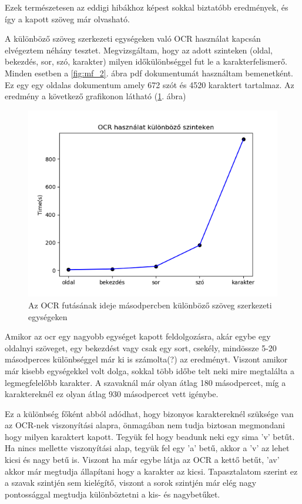 Ezek természetesen az eddigi hibákhoz képest sokkal biztatóbb eredmények, és így a kapott szöveg már olvasható. 

A különböző szöveg szerkezeti egységeken való OCR használat kapcsán elvégeztem néhány tesztet. Megvizsgáltam, hogy az adott szinteken (oldal, bekezdés, sor, szó, karakter) milyen időkülönbséggel fut le a karakterfelismerő. Minden esetben a \ref{fig:mf_2}. ábra pdf dokumentumát használtam bemenetként. Ez egy egy oldalas dokumentum amely 672 szót és 4520 karaktert tartalmaz. Az eredmény a következő grafikonon látható (\ref{fig:test ocr}. ábra)

\begin{figure}[H]
\centering
\includegraphics[scale=1]{images/test_ocr.png}
\caption{Az OCR futásának ideje másodpercben különböző szöveg szerkezeti egységeken}
\label{fig:test ocr}
\end{figure}

Amikor az ocr egy nagyobb egységet kapott feldolgozásra, akár egybe egy oldalnyi szöveget, egy bekezdést vagy csak egy sort, csekély, mindössze 5-20 másodperces különbséggel már ki is számolta(?) az eredményt. Viszont amikor már kisebb egységekkel volt dolga, sokkal több időbe telt neki mire megtalálta a legmegfelelőbb karakter. A szavaknál már olyan átlag 180 másodpercet, míg a karaktereknél ez olyan átlag 930 másodpercet vett igénybe. 

Ez a különbség főként abból adódhat, hogy bizonyos karaktereknél szüksége van az OCR-nek viszonyítási alapra, önmagában nem tudja biztosan megmondani hogy milyen karaktert kapott. Tegyük fel hogy beadunk neki egy sima 'v' betűt. Ha nincs mellette viszonyítási alap, tegyük fel egy 'a' betű, akkor a 'v' az lehet kicsi és nagy betű is. Viszont ha már egybe látja az OCR a kettő betűt, 'av' akkor már megtudja állapítani hogy a karakter az kicsi. Tapasztalatom szerint ez a szavak szintjén sem kielégítő, viszont a sorok szintjén már elég nagy pontossággal megtudja különböztetni a kis- és nagybetűket.

